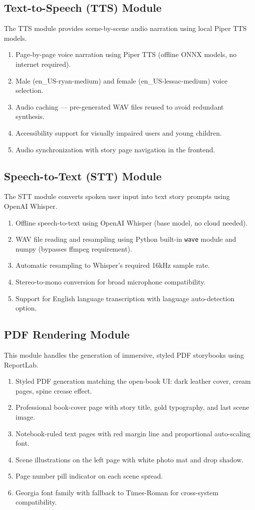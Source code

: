 \subsection{Text-to-Speech (TTS) Module}
The TTS module provides scene-by-scene audio narration using local Piper TTS models.
\begin{enumerate}
    \item Page-by-page voice narration using Piper TTS (offline ONNX models, no internet required).
    \item Male (en\_US-ryan-medium) and female (en\_US-lessac-medium) voice selection.
    \item Audio caching — pre-generated WAV files reused to avoid redundant synthesis.
    \item Accessibility support for visually impaired users and young children.
    \item Audio synchronization with story page navigation in the frontend.
\end{enumerate}

\subsection{Speech-to-Text (STT) Module}
The STT module converts spoken user input into text story prompts using OpenAI Whisper.
\begin{enumerate}
    \item Offline speech-to-text using OpenAI Whisper (base model, no cloud needed).
    \item WAV file reading and resampling using Python built-in \texttt{wave} module and numpy (bypasses ffmpeg requirement).
    \item Automatic resampling to Whisper's required 16kHz sample rate.
    \item Stereo-to-mono conversion for broad microphone compatibility.
    \item Support for English language transcription with language auto-detection option.
\end{enumerate}

\subsection{PDF Rendering Module}
This module handles the generation of immersive, styled PDF storybooks using ReportLab.
\begin{enumerate}
    \item Styled PDF generation matching the open-book UI: dark leather cover, cream pages, spine crease effect.
    \item Professional book-cover page with story title, gold typography, and last scene image.
    \item Notebook-ruled text pages with red margin line and proportional auto-scaling font.
    \item Scene illustrations on the left page with white photo mat and drop shadow.
    \item Page number pill indicator on each scene spread.
    \item Georgia font family with fallback to Times-Roman for cross-system compatibility.
\end{enumerate}

